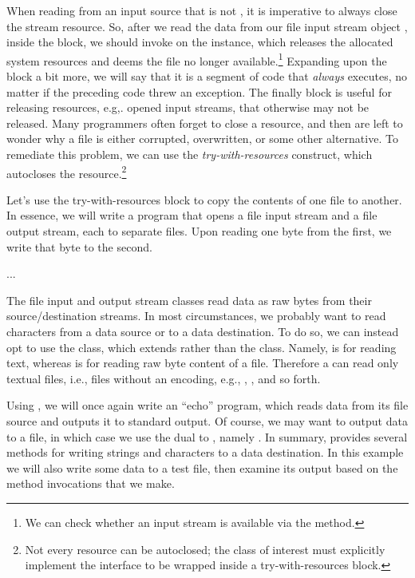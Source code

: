 When reading from an input source that is not , it is imperative to always close the stream resource. So, after we read the data from our file input stream object , inside the  block, we should invoke  on the instance, which releases the allocated system resources and deems the file no longer available.\footnote{We can check whether an input stream is available via the  method.} Expanding upon the  block a bit more, we will say that it is a segment of code that \textit{always} executes, no matter if the preceding code threw an exception. The finally block is useful for releasing resources, e.g,. opened input streams, that otherwise may not be released. Many programmers often forget to close a resource, and then are left to wonder why a file is either corrupted, overwritten, or some other alternative. To remediate this problem, we can use the \textit{try-with-resources} construct, which autocloses the resource.\footnote{Not every resource can be autoclosed; the class of interest must explicitly implement the  interface to be wrapped inside a try-with-resources block.}

\example Let's use the try-with-resources block to copy the contents of one file to another. In essence, we will write a program that opens a file input stream and a file output stream, each to separate files. Upon reading one byte from the first, we write that byte to the second.

...


The file input and output stream classes read data as raw bytes from their source/destination streams. In most circumstances, we probably want to read characters from a data source or to a data destination. To do so, we can instead opt to use the  class, which extends  rather than the  class. Namely,  is for reading text, whereas  is for reading raw byte content of a file. Therefore a  can read only textual files, i.e., files without an encoding, e.g., , , and so forth.

\example Using , we will once again write an ``echo'' program, which reads data from its file source and outputs it to standard output. Of course, we may want to output data to a file, in which case we use the dual to , namely . In summary,  provides several methods for writing strings and characters to a data destination. In this example we will also write some data to a test file, then examine its output based on the method invocations that we make. 

